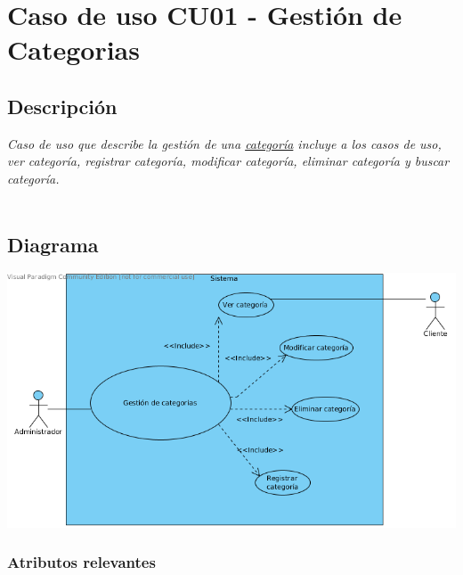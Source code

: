 \newpage
		\hypertarget{Gestion de Categorias}{}
		\hypertarget{CU01}{}
		\section{\textbf{Caso de uso CU01 - Gesti\'on de Categorias}}

			\subsection{Descripci\'on}
				\textsl{Caso de uso que describe la gesti\'on de  una \hyperlink{Categoria}{categor\'ia} incluye a los casos de uso, ver categor\'ia, registrar categor\'ia, modificar categor\'ia, eliminar categor\'ia y buscar categor\'ia. \\ \\}
			\subsection{Diagrama}
				\includegraphics[scale=0.9]{images/casos/gestionCategoria.png}
				
			\subsubsection{ \textbf{Atributos relevantes} }

